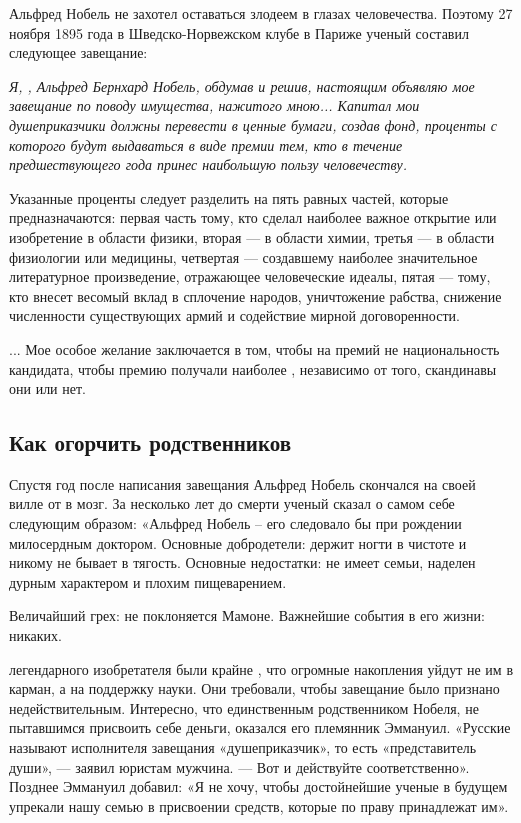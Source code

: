 Альфред Нобель не захотел оставаться злодеем в глазах человечества. Поэтому 27 ноября 1895 года в Шведско-Норвежском клубе в Париже ученый составил следующее завещание:

{\it
Я, , Альфред Бернхард Нобель, обдумав и решив, настоящим объявляю мое завещание по поводу имущества, нажитого мною... Капитал мои душеприказчики должны перевести в ценные бумаги, создав фонд, проценты с которого будут выдаваться в виде премии тем, кто в течение предшествующего года принес наибольшую пользу человечеству.

Указанные проценты следует разделить на пять равных частей, которые предназначаются: первая часть тому, кто сделал наиболее важное открытие или изобретение в области физики, вторая --- в области химии, третья --- в области физиологии или медицины, четвертая --- создавшему наиболее значительное литературное произведение, отражающее человеческие идеалы, пятая --- тому, кто внесет весомый вклад в сплочение народов, уничтожение рабства, снижение численности существующих армий и содействие мирной договоренности.

... Мое особое желание заключается в том, чтобы на  премий не  национальность кандидата, чтобы премию получали наиболее , независимо от того, скандинавы они или нет.}

\subsection{Как огорчить родственников}
Спустя год после написания завещания Альфред Нобель скончался на своей вилле от  в мозг. За несколько лет до смерти ученый сказал о самом себе следующим образом: «Альфред Нобель -- его  следовало бы  при рождении милосердным доктором. Основные добродетели: держит ногти в чистоте и никому не бывает в тягость. Основные недостатки: не имеет семьи, наделен дурным характером и плохим пищеварением.

\begin{fancyquotes}
    Величайший грех: не поклоняется Мамоне. Важнейшие события в его жизни: никаких.
\end{fancyquotes}

 легендарного изобретателя были крайне , что огромные накопления уйдут не им в карман, а на поддержку науки. Они требовали, чтобы завещание было признано недействительным. Интересно, что единственным родственником Нобеля, не пытавшимся присвоить себе деньги, оказался его племянник Эммануил. «Русские называют исполнителя завещания «душеприказчик», то есть «представитель души», --- заявил юристам мужчина. --- Вот и действуйте соответственно». Позднее Эммануил добавил: «Я не хочу, чтобы достойнейшие ученые в будущем упрекали нашу семью в присвоении средств, которые по праву принадлежат им».

